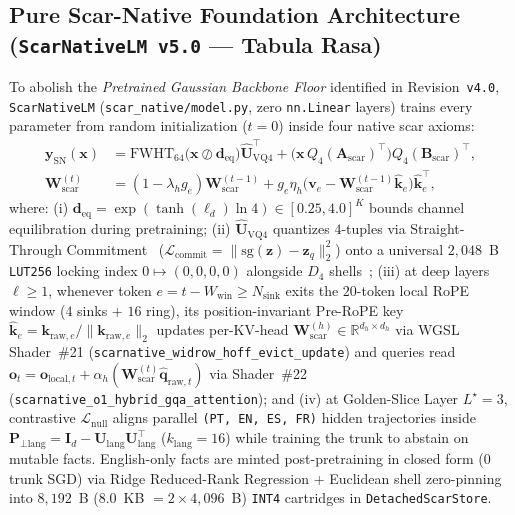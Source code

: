 \documentclass[10pt,twocolumn]{article}
\begin{document}
\subsection{Pure Scar-Native Foundation Architecture (\texttt{ScarNativeLM v5.0} --- Tabula Rasa)}
To abolish the \emph{Pretrained Gaussian Backbone Floor} identified in Revision~\texttt{v4.0}, \texttt{ScarNativeLM} (\texttt{scar\_native/model.py}, zero \texttt{nn.Linear} layers) trains every parameter from random initialization ($t=0$) inside four native scar axioms:
\begin{align}
    \mathbf{y}_{\text{SN}}(\mathbf{x}) &= \mathrm{FWHT}_{64}\!\big(\mathbf{x} \oslash \mathbf{d}_{\text{eq}}\big)\widehat{\mathbf{U}}_{\text{VQ4}}^\top + \big(\mathbf{x}\,Q_4(\mathbf{A}_{\text{scar}})^\top\big)Q_4(\mathbf{B}_{\text{scar}})^\top, \nonumber \\
    \mathbf{W}_{\text{scar}}^{(t)} &= (1 - \lambda_h g_e)\mathbf{W}_{\text{scar}}^{(t-1)} + g_e \eta_h \big(\mathbf{v}_e - \mathbf{W}_{\text{scar}}^{(t-1)}\hat{\mathbf{k}}_e\big)\hat{\mathbf{k}}_e^\top,
    \label{eq:scarnative}
\end{align}
where: (i) $\mathbf{d}_{\text{eq}} = \exp(\tanh(\boldsymbol{\ell}_d)\ln 4) \in [0.25, 4.0]^K$ bounds channel equilibration during pretraining; (ii) $\widehat{\mathbf{U}}_{\text{VQ4}}$ quantizes $4$-tuples via Straight-Through Commitment~\citep{bengio2013estimating} ($\mathcal{L}_{\text{commit}} = \|\mathrm{sg}(\mathbf{z}) - \mathbf{z}_q\|_2^2$) onto a universal $2{,}048$~B \texttt{LUT256} locking index $0 \mapsto (0,0,0,0)$ alongside $D_4$ shells~\citep{conway1982fast}; (iii) at deep layers $\ell \ge 1$, whenever token $e = t - W_{\text{win}} \ge N_{\text{sink}}$ exits the $20$-token local RoPE window ($4$ sinks + $16$ ring), its position-invariant Pre-RoPE key $\hat{\mathbf{k}}_e = \mathbf{k}_{\text{raw},e}/\|\mathbf{k}_{\text{raw},e}\|_2$ updates per-KV-head $\mathbf{W}_{\text{scar}}^{(h)} \in \mathbb{R}^{d_h \times d_h}$ via WGSL Shader~\#21 (\texttt{scarnative\_widrow\_hoff\_evict\_update}) and queries read $\mathbf{o}_t = \mathbf{o}_{\text{local},t} + \alpha_h(\mathbf{W}_{\text{scar}}^{(t)}\hat{\mathbf{q}}_{\text{raw},t})$ via Shader~\#22 (\texttt{scarnative\_o1\_hybrid\_gqa\_attention}); and (iv) at Golden-Slice Layer $L^\star=3$, contrastive $\mathcal{L}_{\text{null}}$ aligns parallel \texttt{(PT, EN, ES, FR)} hidden trajectories inside $\mathbf{P}_{\perp\text{lang}} = \mathbf{I}_d - \mathbf{U}_{\text{lang}}\mathbf{U}_{\text{lang}}^\top$ ($k_{\text{lang}}=16$) while training the trunk to abstain on mutable facts. English-only facts are minted post-pretraining in closed form ($0$ trunk SGD) via Ridge Reduced-Rank Regression + Euclidean shell zero-pinning into $8{,}192$~B ($8.0$~KB $= 2\times 4{,}096$~B) \texttt{INT4} cartridges in \texttt{DetachedScarStore}.
\end{document}
